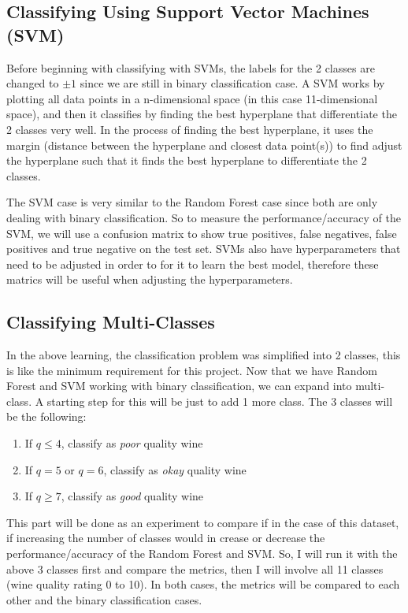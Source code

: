 \documentclass[13pt,a4paper,titlepage]{article}
\begin{document}
	\subsection*{Classifying Using Support Vector Machines (SVM)}
	Before beginning with classifying with SVMs, the labels for the 2 classes are changed to $\pm 1$ since we are still in binary classification case. A SVM works by plotting all data points in a n-dimensional space (in this case 11-dimensional space), and then it classifies by finding the best hyperplane that differentiate the 2 classes very well. In the process of finding the best hyperplane, it uses the margin (distance between the hyperplane and closest data point(s)) to find adjust the hyperplane such that it finds the best hyperplane to differentiate the 2 classes. 
	
		The SVM case is very similar to the Random Forest case since both are only dealing with binary classification. So to measure the performance/accuracy of the SVM, we will use a confusion matrix to show true positives, false negatives, false positives and true negative on the test set. SVMs also have hyperparameters that need to be adjusted in order to for it to learn the best model, therefore these matrics will be useful when adjusting the hyperparameters. 
	\subsection*{Classifying Multi-Classes}
	In the above learning, the classification problem was simplified into 2 classes, this is like the minimum requirement for this project. Now that we have Random Forest and SVM working with binary classification, we can expand into multi-class. A starting step for this will be just to add 1 more class. The 3 classes will be the following:
	\begin{enumerate}
		\item If $q\leq 4$, classify as \textit{poor} quality wine
		\item If $q=5$ or $q=6$, classify as \textit{okay} quality wine
		\item If $q\geq 7$, classify as \textit{good} quality wine
	\end{enumerate}
	This part will be done as an experiment to compare if in the case of this dataset, if increasing the number of classes would in crease or decrease the performance/accuracy of the Random Forest and SVM. So, I will run it with the above 3 classes first and compare the metrics, then I will involve all 11 classes (wine quality rating 0 to 10). In both cases, the metrics will be compared to each other and the binary classification cases.
\end{document}
